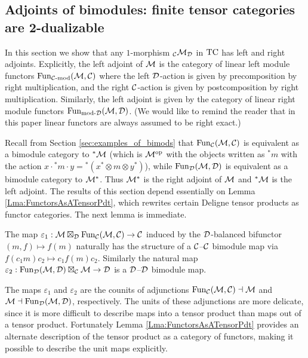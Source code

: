 \documentclass{amsart}
\begin{document}
\subsection{Adjoints of bimodules: finite tensor categories are 2-dualizable}  \label{sec:df-modules}

In this section we show that any $1$-morphism ${}_\mathcal C \mathcal M_\mathcal D$ in $\mathrm{TC}$ has left and right adjoints.   Explicitly, the left adjoint of $\mathcal M$ is the category of linear left module functors $\operatorname{Fun}_{{\mathcal C\text{-mod}}}(\mathcal M, \mathcal C)$ where the left $\mathcal D$-action is given by precomposition by right multiplication, and the right $\mathcal C$-action is given by postcomposition by right multiplication.  Similarly, the left adjoint is given by the category of linear right module functors $\operatorname{Fun}_{\text{mod-}\mathcal D}(\mathcal M, \mathcal D)$.   (We would like to remind the reader that in this paper linear functors are always assumed to be right exact.)  

Recall from Section \ref{sec:examples_of_bimods} that 
$\operatorname{Fun}_{{\mathcal C}}(\mathcal M, \mathcal C)$ is equivalent as a bimodule category to ${}^*\mathcal M$ (which is $\mathcal M^{\mathrm{op}}$ with the objects written as ${}^*m$ with the action $x \cdot {}^*m \cdot y = {}^*(x^* \otimes m \otimes y^*)$), while $\operatorname{Fun}_{\mathcal D}(\mathcal M, \mathcal D)$ is equivalent as a bimodule category to $\mathcal M^*$.  Thus $\mathcal M^*$ is the right adjoint of $\mathcal M$ and ${}^* \mathcal M$ is the left adjoint.
The results of this section depend essentially on Lemma \ref{Lma:FunctorsAsATensorPdt}, which rewrites certain Deligne tensor products as functor categories. The next lemma is immediate. 

\begin{lemma}
The map $\varepsilon_1: \mathcal M \boxtimes_{\mathcal D} \operatorname{Fun}_{\mathcal C}(\mathcal M, \mathcal C) \rightarrow \mathcal C$ induced by the $\mathcal D$-balanced bifunctor $(m, f) \mapsto f(m)$ naturally has the structure of a $\mathcal C$--$\mathcal C$ bimodule map via $ f(c_1 m) c_2 \mapsto c_1 f(m) c_2$. Similarly the natural map $\varepsilon_2: \operatorname{Fun}_{{\mathcal D}}(\mathcal M, \mathcal D) \boxtimes_{\mathcal C} \mathcal M \rightarrow \mathcal D$ is a $\mathcal D$--$\mathcal D$ bimodule map. 
\end{lemma} 

The maps $\varepsilon_1$ and $\varepsilon_2$ are the counits of adjunctions $\operatorname{Fun}_{\mathcal C}(\mathcal M, \mathcal C) \dashv \mathcal M$ and $\mathcal M \dashv \operatorname{Fun}_{{\mathcal D}}(\mathcal M, \mathcal D)$, respectively. The units of these adjunctions are more delicate, since it is more difficult to describe maps into a tensor product than maps out of a tensor product. Fortunately Lemma \ref{Lma:FunctorsAsATensorPdt} provides an alternate description of the tensor product as a category of functors, making it possible  to describe the unit maps explicitly. 
\end{document}
